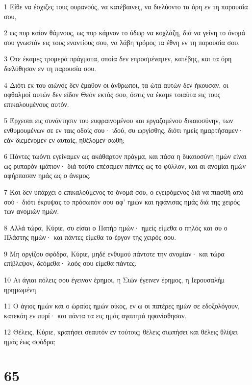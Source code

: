 \par 1 Είθε να έσχιζες τους ουρανούς, να κατέβαινες, να διελύοντο τα όρη εν τη παρουσία σου,
\par 2 ως πυρ καίον θάμνους, ως πυρ κάμνον το ύδωρ να κοχλάζη, διά να γείνη το όνομά σου γνωστόν εις τους εναντίους σου, να λάβη τρόμος τα έθνη εν τη παρουσία σου.
\par 3 Ότε έκαμες τρομερά πράγματα, οποία δεν επροσμέναμεν, κατέβης, και τα όρη διελύθησαν εν τη παρουσία σου.
\par 4 Διότι εκ του αιώνος δεν έμαθον οι άνθρωποι, τα ώτα αυτών δεν ήκουσαν, οι οφθαλμοί αυτών δεν είδον Θεόν εκτός σου, όστις να έκαμε τοιαύτα εις τους επικαλουμένους αυτόν.
\par 5 Έρχεσαι εις συνάντησιν του ευφραινομένου και εργαζομένου δικαιοσύνην, των ενθυμουμένων σε εν ταις οδοίς σου· ιδού, συ ωργίσθης, διότι ημείς ημαρτήσαμεν· εάν διεμένομεν εν αυταίς, ηθέλομεν σωθή;
\par 6 Πάντες τωόντι εγείναμεν ως ακάθαρτον πράγμα, και πάσα η δικαιοσύνη ημών είναι ως ρυπαρόν ιμάτιον· διά τούτο επέσαμεν πάντες ως το φύλλον, και αι ανομίαι ημών αφήρπασαν ημάς ως ο άνεμος.
\par 7 Και δεν υπάρχει ο επικαλούμενος το όνομά σου, ο εγειρόμενος διά να πιασθή από σού· διότι έκρυψας το πρόσωπόν σου αφ' ημών και ηφάνισας ημάς διά της χειρός των ανομιών ημών.
\par 8 Αλλά τώρα, Κύριε, συ είσαι ο Πατήρ ημών· ημείς είμεθα ο πηλός και συ ο Πλάστης ημών· και πάντες είμεθα το έργον της χειρός σου.
\par 9 Μη οργίζου σφόδρα, Κύριε, μηδέ ενθυμού πάντοτε την ανομίαν· και τώρα επίβλεψον, δεόμεθα· λαός σου είμεθα πάντες.
\par 10 Αι άγιαι πόλεις σου έγειναν έρημοι, η Σιών έγεινεν έρημος, η Ιερουσαλήμ ηρημωμένη.
\par 11 Ο άγιος ημών και ο ώραίος ημών οίκος, εν ω οι πατέρες ημών σε εδοξολόγουν, κατεκάη εν πυρί· και πάντα τα εις ημάς αγαπητά ηφανίσθησαν.
\par 12 Θέλεις, Κύριε, κρατήσει σεαυτόν εν τούτοις; θέλεις σιωπήσει και θέλεις θλίψει ημάς έως σφόδρα;

\chapter{65}

